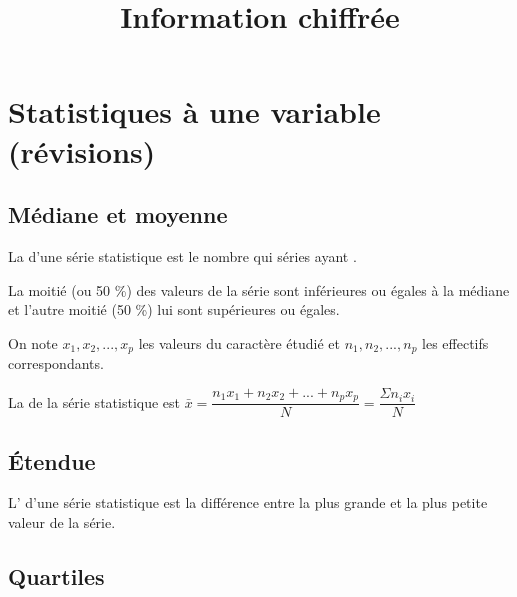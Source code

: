 \documentclass[12pt,a4paper]{article}
\date{}
\title{Information chiffrée }
\begin{document}




\section{Statistiques à une variable (révisions)}

\subsection{Médiane et moyenne}
\begin{mydef}
	La  d'une série statistique est le nombre qui  séries ayant .
	
	La moitié (ou 50 \%)  des valeurs de la série sont inférieures ou égales à la médiane et l'autre moitié (50 \%) lui sont supérieures ou égales.
\end{mydef}

\begin{mydef}
	On note $x_1, x_2, ..., x_p$ les valeurs du caractère étudié et $n_1, n_2, ...,n_p$ les effectifs correspondants.
	
	La  de la série statistique est $\bar{x} = \dfrac{n_1x_1 + n_2x_2 + ... + n_px_p}{N} = \dfrac{\Sigma n_ix_i}{N} $
	
\end{mydef}

\subsection{\'Etendue}

\begin{mydef}
	L' d'une série statistique est la différence entre la plus grande et la plus petite valeur de la série.
\end{mydef}	



\subsection{Quartiles}
\end{document}
